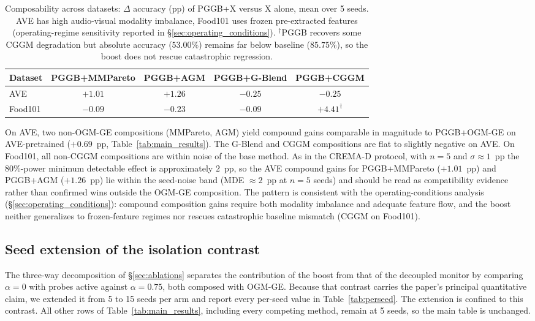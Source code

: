 \documentclass{article}
\begin{document}
\begin{table}[H]
\centering
\caption{Composability across datasets: $\Delta$ accuracy (pp) of PGGB+X versus X alone, mean over 5 seeds. AVE has high audio-visual modality imbalance, Food101 uses frozen pre-extracted features (operating-regime sensitivity reported in \S\ref{sec:operating_conditions}). $^\dagger$PGGB recovers some CGGM degradation but absolute accuracy ($53.00\%$) remains far below baseline ($85.75\%$), so the boost does not rescue catastrophic regression.}
\label{tab:composability_extended}
\begin{tabular}{lcccc}
\toprule
\textbf{Dataset} & \textbf{PGGB+MMPareto} & \textbf{PGGB+AGM} & \textbf{PGGB+G-Blend} & \textbf{PGGB+CGGM} \\
\midrule
AVE     & $+1.01$ & $+1.26$ & $-0.25$ & $-0.25$ \\
Food101 & $-0.09$ & $-0.23$ & $-0.09$ & $+4.41^\dagger$ \\
\bottomrule
\end{tabular}
\end{table}

On AVE, two non-OGM-GE compositions (MMPareto, AGM) yield compound gains comparable in magnitude to PGGB+OGM-GE on AVE-pretrained ($+0.69$~pp, Table~\ref{tab:main_results}). The G-Blend and CGGM compositions are flat to slightly negative on AVE. On Food101, all non-CGGM compositions are within noise of the base method. As in the CREMA-D protocol, with $n{=}5$ and $\sigma \approx 1$~pp the 80\%-power minimum detectable effect is approximately $2$~pp, so the AVE compound gains for PGGB+MMPareto ($+1.01$~pp) and PGGB+AGM ($+1.26$~pp) lie within the seed-noise band (MDE $\approx 2$~pp at $n{=}5$ seeds) and should be read as compatibility evidence rather than confirmed wins outside the OGM-GE composition. The pattern is consistent with the operating-conditions analysis (\S\ref{sec:operating_conditions}): compound composition gains require both modality imbalance and adequate feature flow, and the boost neither generalizes to frozen-feature regimes nor rescues catastrophic baseline mismatch (CGGM on Food101).

\subsection{Seed extension of the isolation contrast}
\label{app:perseed}

The three-way decomposition of \S\ref{sec:ablations} separates the contribution of the boost from that of the decoupled monitor by comparing $\alpha{=}0$ with probes active against $\alpha{=}0.75$, both composed with OGM-GE. Because that contrast carries the paper's principal quantitative claim, we extended it from 5 to 15 seeds per arm and report every per-seed value in Table~\ref{tab:perseed}. The extension is confined to this contrast. All other rows of Table~\ref{tab:main_results}, including every competing method, remain at 5 seeds, so the main table is unchanged.
\end{document}
